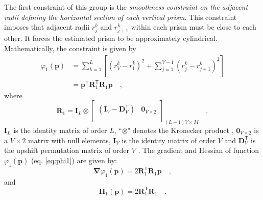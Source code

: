 The first constraint of this group is the \textit{smoothness constraint on the adjacent radii defining the horizontal section of each vertical prism}. This constraint imposes that adjacent radii $r_{j}^{k}$ and $r_{j+1}^{k}$ within each prism must be close to each other. It forces the estimated prism to be approximately cylindrical. Mathematically, the constraint is given by \begin{equation}\label{eq:phi1}
\begin{split}
\varphi_{1}(\mathbf{p}) &= \sum\limits^{L}_{k=1}\left[\left(r^{k}_{V}-r^{k}_{1}\right)^2 + \sum\limits^{V-1}_{j=1}\left(r^{k}_{j}-r^{k}_{j+1}\right)^2\right]\\
 &= \mathbf{p}^{\mathsf{T}} \mathbf{R}^{\mathsf{T}}_{1}\mathbf{R}_{1} \mathbf{p} \quad ,
\end{split}
\end{equation}
where
\begin{equation}
\mathbf{R}_{1} = 
\mathbf{I}_{L} \otimes 
\begin{bmatrix}
\left( \mathbf{I}_{V} - \mathbf{D}_{V}^\mathsf{T} \right) & \mathbf{0}_{V \times 2} \\
\end{bmatrix}_{(L-1)V \times M} \quad ,
\label{eq:S1-matrix}
\end{equation}
$\mathbf{I}_{L}$ is the identity matrix of order $L$, ``$\otimes$" denotes the Kronecker product \cite[][ p. 243]{horn_johnson1991}, $\mathbf{0}_{V \times 2}$ is a $V \times 2$ matrix with null elements, 
$\mathbf{I}_{V}$ is the identity matrix of order $V$ and $\mathbf{D}_{V}^\mathsf{T}$ is the upshift permutation matrix of order $V$ \cite[][ p. 20]{golub-vanloan2013}. The gradient and Hessian of function $\varphi_{1}(\mathbf{p})$ (eq. \ref{eq:phi1}) are given by:
\begin{equation}\label{eq:phi1_grad}
\boldsymbol{\nabla}\varphi_{1}(\mathbf{p}) = 2 \mathbf{R}^\mathsf{T}_{1}\mathbf{R}_{1}\mathbf{p} \quad ,
\end{equation}
and
\begin{equation}\label{eq:phi1_hessian}
\mathbf{H}_{1}(\mathbf{p}) = 2\mathbf{R}^\mathsf{T}_{1}\mathbf{R}_{1} \quad .
\end{equation}

